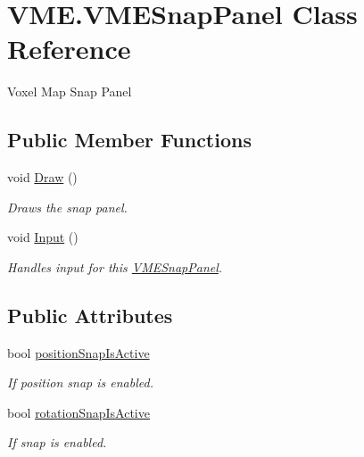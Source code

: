 \hypertarget{class_v_m_e_1_1_v_m_e_snap_panel}{}\section{V\+M\+E.\+V\+M\+E\+Snap\+Panel Class Reference}
\label{class_v_m_e_1_1_v_m_e_snap_panel}


Voxel Map Snap Panel  


\subsection*{Public Member Functions}
\begin{DoxyCompactItemize}
\item 
void \hyperlink{class_v_m_e_1_1_v_m_e_snap_panel_ae1d34b15fee18534b9322de762345454}{Draw} ()
\begin{DoxyCompactList}\small\item\em Draws the snap panel. \end{DoxyCompactList}\item 
void \hyperlink{class_v_m_e_1_1_v_m_e_snap_panel_aa9fc552aea9e35017f48e53d38d9777b}{Input} ()
\begin{DoxyCompactList}\small\item\em Handles input for this \hyperlink{class_v_m_e_1_1_v_m_e_snap_panel}{V\+M\+E\+Snap\+Panel}. \end{DoxyCompactList}\end{DoxyCompactItemize}
\subsection*{Public Attributes}
\begin{DoxyCompactItemize}
\item 
bool \hyperlink{class_v_m_e_1_1_v_m_e_snap_panel_a8969f82f008fef4f0dfdc153f546330d}{position\+Snap\+Is\+Active}
\begin{DoxyCompactList}\small\item\em If position snap is enabled. \end{DoxyCompactList}\item 
bool \hyperlink{class_v_m_e_1_1_v_m_e_snap_panel_a77d0a41f559b90829555a64079f47ccf}{rotation\+Snap\+Is\+Active}
\begin{DoxyCompactList}\small\item\em If snap is enabled. \end{DoxyCompactList}\end{DoxyCompactItemize}


